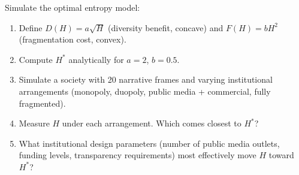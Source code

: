 \begin{exercise}[Computational]
Simulate the optimal entropy model:
\begin{enumerate}[nosep]
  \item Define $D(H) = a\sqrt{H}$ (diversity benefit, concave) and $F(H) = bH^2$ (fragmentation cost, convex).
  \item Compute $H^*$ analytically for $a = 2$, $b = 0.5$.
  \item Simulate a society with 20 narrative frames and varying institutional arrangements (monopoly, duopoly, public media + commercial, fully fragmented).
  \item Measure $H$ under each arrangement. Which comes closest to $H^*$?
  \item What institutional design parameters (number of public media outlets, funding levels, transparency requirements) most effectively move $H$ toward $H^*$?
\end{enumerate}
\end{exercise}

